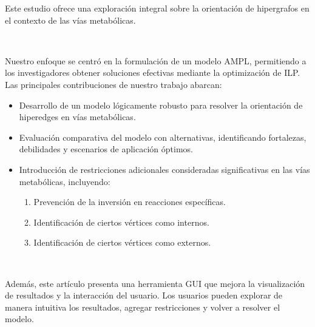 Este estudio ofrece una exploración integral sobre la orientación de hipergrafos en el contexto de las vías metabólicas.

~

Nuestro enfoque se centró en la formulación de un modelo AMPL, permitiendo a los investigadores obtener soluciones efectivas mediante la optimización de ILP. Las principales contribuciones de nuestro trabajo abarcan:

\begin{itemize}
\item Desarrollo de un modelo lógicamente robusto para resolver la orientación de hiperedges en vías metabólicas.
\item Evaluación comparativa del modelo con alternativas, identificando fortalezas, debilidades y escenarios de aplicación óptimos.
\item Introducción de restricciones adicionales consideradas significativas en las vías metabólicas, incluyendo:
\begin{enumerate}[left=2em]
\item Prevención de la inversión en reacciones específicas.
\item Identificación de ciertos vértices como internos.
\item Identificación de ciertos vértices como externos.
\end{enumerate}
\end{itemize}

~

Además, este artículo presenta una herramienta GUI que mejora la visualización de resultados y la interacción del usuario. Los usuarios pueden explorar de manera intuitiva los resultados, agregar restricciones y volver a resolver el modelo.